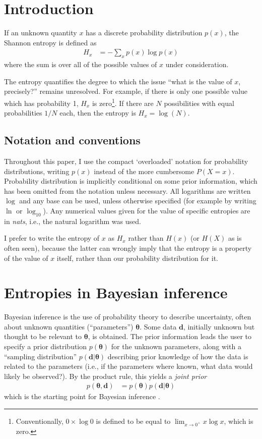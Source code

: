 \documentclass[entropy,article,accept,oneauthor,pdftex,10pt,a4paper]{mdpi}
\renewcommand{\d}{\boldsymbol{d}}
\newcommand{\x}{\boldsymbol{\theta}}
\begin{document}

\section{Introduction}

If an unknown quantity $x$ has a discrete probability distribution $p(x)$,
the Shannon entropy \citep{shannon} is defined as
\begin{align}
H_{x} &= -\sum_{x} p(x) \log p(x)
\end{align}
where the sum is over all of the possible values of $x$ under consideration.

The entropy quantifies the degree to which the issue
``what is the value of $x$, precisely?'' remains unresolved. For example,
if there is only one possible value which has probability 1, $H_x$ is
zero\footnote{Conventionally, $0 \times \log 0$ is defined to be equal
to $\lim_{x \to 0^+} x\log x$, which is zero.}.
If there are $N$ possibilities with equal probabilities $1/N$ each,
then the entropy is $H_x = \log(N)$.

\subsection{Notation and conventions}

Throughout this paper, I use the compact
`overloaded' notation for probability distributions, writing $p(x)$ instead
of the more cumbersome $P(X=x)$.
Probability distribution is implicitly conditional on some prior
information, which has been omitted from the notation unless necessary.
All logarithms are written $\log$ and any base can be used, unless otherwise
specified (for example by writing $\ln$ or $\log_{10}$). Any numerical
values given for the value of specific entropies are in {\em nats}, i.e.,
the natural logarithm was used.

I prefer to write the entropy of $x$ as $H_x$ rather than $H(x)$
(or $H(X)$ as is often seen), because the latter can wrongly imply that
the entropy is a property of the value of $x$ itself, rather than
our probability distribution for it.

\section{Entropies in Bayesian inference}

Bayesian inference is the use of probability theory to
describe uncertainty, often about unknown quantities
(``parameters'') $\x$. Some data $\d$, initially unknown but
thought to be relevant to $\x$, is obtained.
The prior information leads the
user to specify a prior distribution $p(\x)$ for the unknown parameters,
along with a ``sampling distribution'' $p(\d | \x)$ describing prior knowledge
of how the data is related to the parameters
(i.e., if the parameters where known, what data would likely be observed?). By the product rule, this yields a {\em joint prior}
\begin{align}
p(\x, \d) &= p(\x)p(\d | \x)
\end{align}
which is the starting point for
Bayesian inference \citep{caticha2008lectures}.
\end{document}
